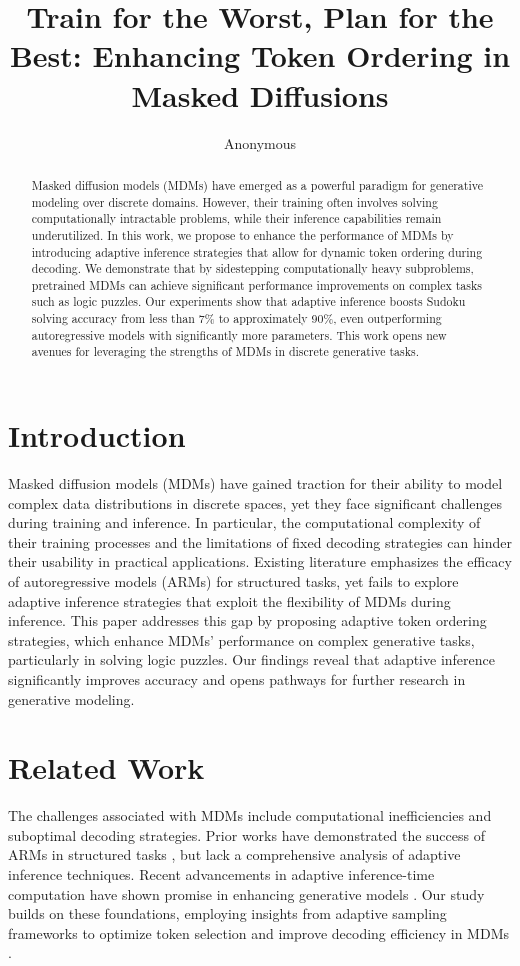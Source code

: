 \documentclass{article} %
\title{
Train for the Worst, Plan for the Best: Enhancing Token Ordering in Masked Diffusions
}
\author{Anonymous}
\theoremstyle{plain}
\theoremstyle{definition}
\theoremstyle{remark}
\begin{document}
\maketitle

\begin{abstract}
Masked diffusion models (MDMs) have emerged as a powerful paradigm for generative modeling over discrete domains. However, their training often involves solving computationally intractable problems, while their inference capabilities remain underutilized. In this work, we propose to enhance the performance of MDMs by introducing adaptive inference strategies that allow for dynamic token ordering during decoding. We demonstrate that by sidestepping computationally heavy subproblems, pretrained MDMs can achieve significant performance improvements on complex tasks such as logic puzzles. Our experiments show that adaptive inference boosts Sudoku solving accuracy from less than 7\% to approximately 90\%, even outperforming autoregressive models with significantly more parameters. This work opens new avenues for leveraging the strengths of MDMs in discrete generative tasks.
\end{abstract}

\section{Introduction}
Masked diffusion models (MDMs) have gained traction for their ability to model complex data distributions in discrete spaces, yet they face significant challenges during training and inference. In particular, the computational complexity of their training processes and the limitations of fixed decoding strategies can hinder their usability in practical applications. Existing literature emphasizes the efficacy of autoregressive models (ARMs) for structured tasks, yet fails to explore adaptive inference strategies that exploit the flexibility of MDMs during inference. This paper addresses this gap by proposing adaptive token ordering strategies, which enhance MDMs' performance on complex generative tasks, particularly in solving logic puzzles. Our findings reveal that adaptive inference significantly improves accuracy and opens pathways for further research in generative modeling.

\section{Related Work}
The challenges associated with MDMs include computational inefficiencies and suboptimal decoding strategies. Prior works have demonstrated the success of ARMs in structured tasks \cite{zheng2024maskeddm, kim2025trainft}, but lack a comprehensive analysis of adaptive inference techniques. Recent advancements in adaptive inference-time computation have shown promise in enhancing generative models \cite{manvi2024adaptiveic}. Our study builds on these foundations, employing insights from adaptive sampling frameworks to optimize token selection and improve decoding efficiency in MDMs \cite{lee2023textconditionedsf, gwak2025rewardweightedse}.
\end{document}

